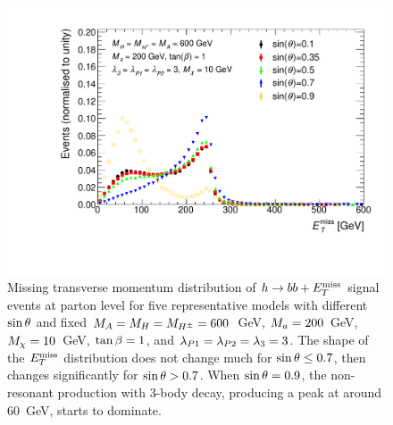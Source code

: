 \begin{figure}[tbp]
\centering
\includegraphics[width=\textwidth]{texinputs/04_grid/figures/monoHbb_sinp_scan_MA600_Ma200_MET_liny_norm2one.pdf}
\caption[$\MET$ distribution in $h\rightarrow bb + \MET$ events for different 
$\sinp$ for $\mA = \mH = \mHc = 600 $ GeV and $\ma = 200$ GeV]
{
Missing transverse momentum distribution of $h\rightarrow bb + \MET$ signal 
events at parton level for five representative models with different $\sinp$ and
 fixed $\mA = \mH = \mHc = 600 $~GeV, $\ma = 200$~GeV, $ M_{\chi} = 10$~GeV, $\tan\beta = 1$, 
and $ \lambda_{P1} = \lambda_{P2} = \lambda_{3} = 3 $. 
The shape of the $\MET$ distribution does not change much  
for $\sin\theta \leq 0.7$, then changes significantly for $\sin\theta> 0.7$. 
When $\sin\theta=0.9$, the non-resonant production with 3-body decay, producing a \MET peak 
at around 60~GeV, starts to dominate.
%
}
\label{fig:monoHbb_sinp_scan_mA600_ma200_met}
\end{figure}



